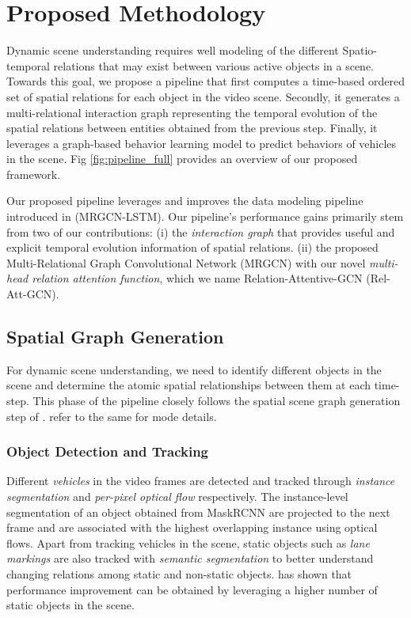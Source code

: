 \documentclass[letterpaper, 10 pt, conference]{ieeeconf}
\begin{document}
\section{Proposed Methodology}
Dynamic scene understanding requires well modeling of the different Spatio-temporal relations that may exist between various active objects in a scene. Towards this goal, we propose a pipeline that first computes a time-based ordered set of spatial relations for each object in the video scene. Secondly, it generates a multi-relational interaction graph representing the temporal evolution of the spatial relations between entities obtained from the previous step. Finally, it leverages a graph-based behavior learning model to predict behaviors of vehicles in the scene. Fig \ref{fig:pipeline_full} provides an overview of our proposed framework. 

Our proposed pipeline leverages and improves the data modeling pipeline introduced in \cite{mylavarapu2020accurate} (MRGCN-LSTM). Our pipeline's performance gains primarily stem from two of our contributions: (i) the \textit{interaction graph} that provides useful and explicit temporal evolution information of spatial relations. (ii) the proposed Multi-Relational Graph Convolutional Network (MRGCN) with our novel  \textit{multi-head relation attention function}, which we name Relation-Attentive-GCN (Rel-Att-GCN). 

\subsection{Spatial Graph Generation}
For dynamic scene understanding, we need to identify different objects in the scene and determine the atomic spatial relationships between them at each time-step. This phase of the pipeline closely follows the spatial scene graph generation step of \cite{mylavarapu2020accurate}. refer to the same for mode details.

\subsubsection{Object Detection and Tracking}
\label{sec:tracking}
Different \textit{vehicles} in the video frames are detected and tracked through \textit{instance segmentation} \cite{MaskRCNN} and \textit{per-pixel optical flow} \cite{pathakCVPR17learning} respectively. The instance-level segmentation of an object obtained from MaskRCNN are projected to the next frame and are associated with the highest overlapping instance using optical flows. Apart from tracking vehicles in the scene, static objects such as \textit{lane markings} are also tracked with \textit{semantic segmentation} \cite{rota2018place} to better understand changing relations among static and non-static objects. \cite{mylavarapu2020accurate} has shown that performance improvement can be obtained by leveraging a higher number of static objects in the scene.  
\end{document}
